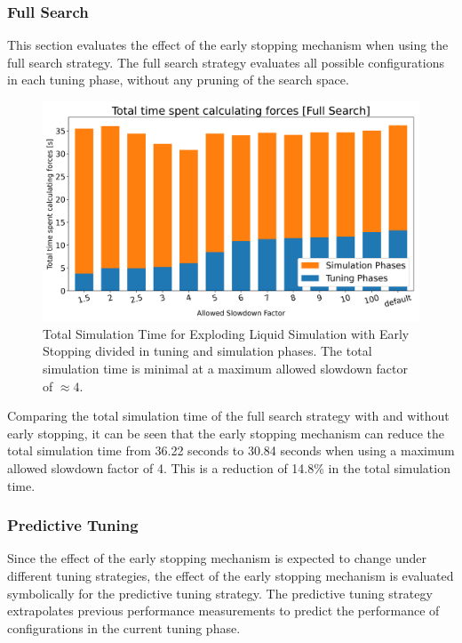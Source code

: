 \documentclass[conference]{IEEEtran}
\begin{document}
\subsubsection{Full Search}

This section evaluates the effect of the early stopping mechanism when using the full search strategy. The full search strategy evaluates all possible configurations in each tuning phase, without any pruning of the search space.

\begin{figure}[H]
    \centering

    \includegraphics[width=\columnwidth]{../data/explodingLiquid/cluster/fullSearch/analytics/total_time_average.png}

    \caption{Total Simulation Time for Exploding Liquid Simulation with Early Stopping divided in tuning and simulation phases. The total simulation time is minimal at a maximum allowed slowdown factor of $\approx4$.}
\end{figure}

Comparing the total simulation time of the full search strategy with and without early stopping, it can be seen that the early stopping mechanism can reduce the total simulation time from 36.22 seconds to 30.84 seconds when using a maximum allowed slowdown factor of 4. This is a reduction of 14.8\% in the total simulation time.

\subsubsection{Predictive Tuning}

Since the effect of the early stopping mechanism is expected to change under different tuning strategies, the effect of the early stopping mechanism is evaluated symbolically for the predictive tuning strategy. The predictive tuning strategy extrapolates previous performance measurements to predict the performance of configurations in the current tuning phase.
\end{document}
